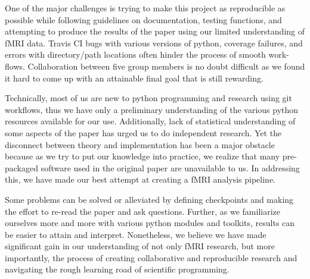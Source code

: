 \documentclass[11pt]{article}
\begin{document}
\par \indent One of the major challenges is trying to make this project as 
reproducible as possible while following guidelines on documentation, testing 
functions, and attempting to produce the results of the paper using our limited
understanding of fMRI data. Travis CI bugs with various versions of python, 
coverage failures, and errors with directory/path locations often hinder the 
process of smooth work-flows. Collaboration between five group members is no 
doubt difficult as we found it hard to come up with an attainable final goal 
that is still rewarding. 
\par Technically, most of us are new to python programming and research using 
git workflows, thus we have only a preliminary understanding of the various 
python resources available for our use. Additionally, lack of statistical 
understanding of some aspects of the paper has urged us to do independent 
research. Yet the disconnect between theory and implementation has been a major 
obstacle because as we try to put our knowledge into practice, we realize that
many pre-packaged software used in the original paper are unavailable to us. 
In addressing this, we have made our best attempt at creating a fMRI analysis 
pipeline. 
\par Some problems can be solved or alleviated by defining checkpoints and making
the effort to re-read the paper and ask questions. Further, as we familiarize 
ourselves more and more  with various python modules and toolkits, results can 
be easier to attain and interpret. Nonetheless, we believe we have made 
significant gain in our understanding of not only fMRI research, but more 
importantly, the process of creating collaborative and reproducible research and
navigating the rough learning road of scientific programming. 



\end{document}
